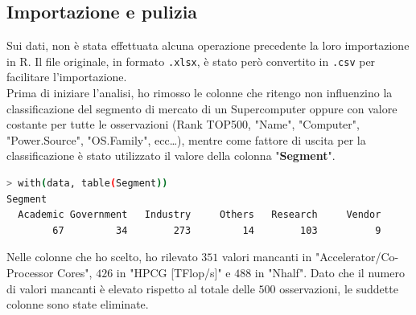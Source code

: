 \documentclass[11pt,a4paper]{article}
\begin{document}
\subsection{Importazione e pulizia}
Sui dati, non \`e stata effettuata alcuna operazione precedente la loro
importazione in R. Il file originale, in formato \texttt{.xlsx}, \`e stato
per\`o convertito in \texttt{.csv} per facilitare l'importazione.\\
Prima di iniziare l'analisi, ho rimosso le colonne che ritengo non influenzino
la classificazione del segmento di mercato di un Supercomputer oppure con valore
costante per tutte le osservazioni (Rank TOP500, "Name", "Computer",
"Power.Source", "OS.Family", ecc\dots), mentre come fattore di uscita per la
classificazione \`e stato utilizzato il valore della colonna "\textbf{Segment}".
\begin{lstlisting}[language=bash,basicstyle=\footnotesize,tabsize=2,frame = single]
> with(data, table(Segment))
Segment
  Academic Government   Industry     Others   Research     Vendor 
        67         34        273         14        103          9
\end{lstlisting}
Nelle colonne che ho scelto, ho rilevato $351$ valori mancanti in
"Accelerator/Co-Processor Cores", $426$ in "HPCG [TFlop/s]" e $488$ in
"Nhalf". Dato che il numero di valori mancanti \`e elevato rispetto al
totale delle $500$ osservazioni, le suddette colonne sono state eliminate.
\end{document}
